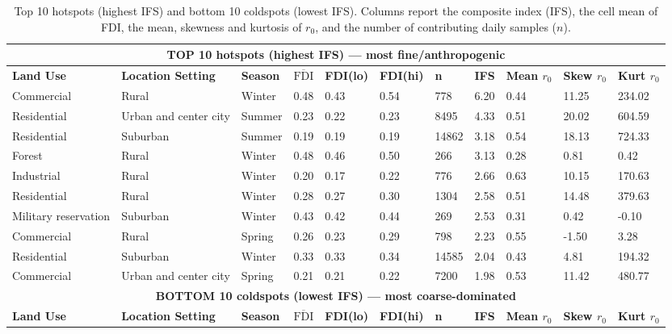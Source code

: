 \documentclass[a4paper,fleqn]{cas-sc}
\begin{document}
\begin{table}[htb]
\centering
\scriptsize
\caption{Top 10 hotspots (highest IFS) and bottom 10 coldspots (lowest IFS). Columns report the composite index (IFS), the cell mean of FDI, the mean, skewness and kurtosis of $r_0$, and the number of contributing daily samples ($n$).}
\label{tab:hotcold_overall}
\begin{tabular}{lllllllllll}
\hline
\multicolumn{11}{c}{\textbf{TOP 10 hotspots (highest IFS) — most fine/anthropogenic}} \\
\hline
\textbf{Land Use} & \textbf{Location Setting} & \textbf{Season} & \textbf{$\overline{\mathrm{FDI}}$} & \textbf{FDI(lo)} & \textbf{FDI(hi)} & \textbf{n} & \textbf{IFS} & \textbf{Mean $r_0$} & \textbf{Skew $r_0$} & \textbf{Kurt $r_0$} \\
\hline
Commercial & Rural & Winter & 0.48 & 0.43 & 0.54 & 778 & 6.20 & 0.44 & 11.25 & 234.02 \\
Residential & Urban and center city & Summer & 0.23 & 0.22 & 0.23 & 8495 & 4.33 & 0.51 & 20.02 & 604.59 \\
Residential & Suburban & Summer & 0.19 & 0.19 & 0.19 & 14862 & 3.18 & 0.54 & 18.13 & 724.33 \\
Forest & Rural & Winter & 0.48 & 0.46 & 0.50 & 266 & 3.13 & 0.28 & 0.81 & 0.42 \\
Industrial & Rural & Winter & 0.20 & 0.17 & 0.22 & 776 & 2.66 & 0.63 & 10.15 & 170.63 \\
Residential & Rural & Winter & 0.28 & 0.27 & 0.30 & 1304 & 2.58 & 0.51 & 14.48 & 379.63 \\
Military reservation & Suburban & Winter & 0.43 & 0.42 & 0.44 & 269 & 2.53 & 0.31 & 0.42 & -0.10 \\
Commercial & Rural & Spring & 0.26 & 0.23 & 0.29 & 798 & 2.23 & 0.55 & -1.50 & 3.28 \\
Residential & Suburban & Winter & 0.33 & 0.33 & 0.34 & 14585 & 2.04 & 0.43 & 4.81 & 194.32 \\
Commercial & Urban and center city & Spring & 0.21 & 0.21 & 0.22 & 7200 & 1.98 & 0.53 & 11.42 & 480.77 \\
\hline
\multicolumn{11}{c}{\textbf{BOTTOM 10 coldspots (lowest IFS) — most coarse-dominated}} \\
\hline
\textbf{Land Use} & \textbf{Location Setting} & \textbf{Season} & \textbf{$\overline{\mathrm{FDI}}$} & \textbf{FDI(lo)} & \textbf{FDI(hi)} & \textbf{n} & \textbf{IFS} & \textbf{Mean $r_0$} & \textbf{Skew $r_0$} & \textbf{Kurt $r_0$} \\

\end{tabular}
\end{table}
\end{document}
